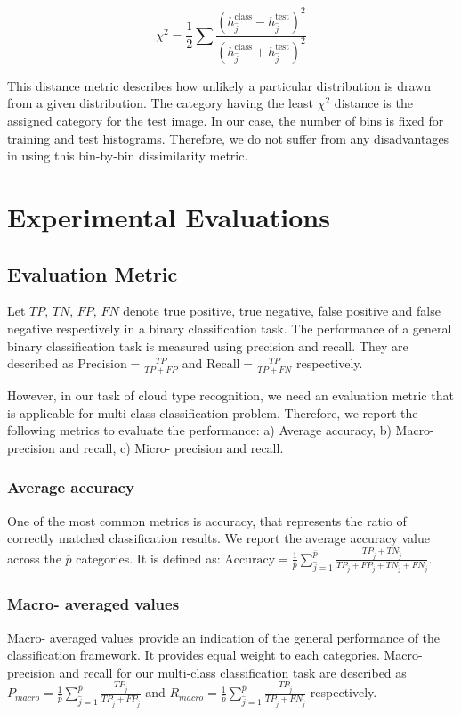 \begin{equation}
\label{eq:chi_metric}
\chi^2=\frac{1}{2}\sum_{ }^{ }\frac{(h_{\hat{j}}^{\mbox{class}}-h_{\hat{j}}^{\mbox{test}})^2}{(h_{\hat{j}}^{\mbox{class}}+h_{\hat{j}}^{\mbox{test}})^2}
\end{equation}

This distance metric describes how unlikely a particular distribution is drawn from a given distribution. The category having the least $\chi^2$ distance is the assigned category for the test image. In our case, the number of bins is fixed for training and test histograms. Therefore, we do not suffer from any disadvantages in using this bin-by-bin dissimilarity metric.

\section{Experimental Evaluations}
\label{sec:chap6-exps}
\subsection{Evaluation Metric}
Let $TP$, $TN$, $FP$, $FN$ denote true positive, true negative, false positive and false negative respectively in a binary classification task. The performance of a general binary classification task is measured using precision and recall. They are described as $\mbox{Precision}=\frac{TP}{TP+FP}$ and $\mbox{Recall}=\frac{TP}{TP+FN}$ respectively. 

However, in our task of cloud type recognition, we need an evaluation metric that is applicable for multi-class classification problem. Therefore, we report the following metrics to evaluate the performance: a) Average accuracy, b) Macro- precision and recall, c) Micro- precision and recall. 

\subsubsection{Average accuracy}
One of the most common metrics is accuracy, that represents the ratio of correctly matched classification results. We report the average accuracy value across the $\overline{p}$ categories. It is defined as: $\mbox{Accuracy}=\frac{1}{\overline{p}}\sum_{\hat{j}=1}^{\overline{p}}\frac{TP_{\hat{j}}+TN_{\hat{j}}}{TP_{\hat{j}}+FP_{\hat{j}}+TN_{\hat{j}}+FN_{\hat{j}}}$.

\subsubsection{Macro- averaged values}
Macro- averaged values provide an indication of the general performance of the classification framework. It provides equal weight to each categories. Macro- precision and recall for our multi-class classification task are described as $P_{macro}=\frac{1}{\overline{p}}\sum_{{\hat{j}}=1}^{\overline{p}}\frac{TP_{\hat{j}}}{TP_{\hat{j}}+FP_{\hat{j}}}$ and $R_{macro}=\frac{1}{\overline{p}}\sum_{{\hat{j}}=1}^{\overline{p}}\frac{TP_{\hat{j}}}{TP_{\hat{j}}+FN_{\hat{j}}}$ respectively. 

